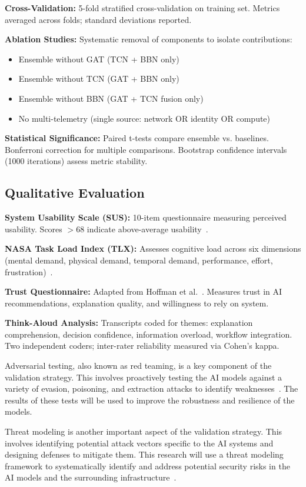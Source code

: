 \textbf{Cross-Validation:} 5-fold stratified cross-validation on training set. Metrics averaged across folds; standard deviations reported.

\textbf{Ablation Studies:} Systematic removal of components to isolate contributions:
\begin{itemize}
    \item Ensemble without GAT (TCN + BBN only)
    \item Ensemble without TCN (GAT + BBN only)
    \item Ensemble without BBN (GAT + TCN fusion only)
    \item No multi-telemetry (single source: network OR identity OR compute)
\end{itemize}

\textbf{Statistical Significance:} Paired t-tests compare ensemble vs. baselines. Bonferroni correction for multiple comparisons. Bootstrap confidence intervals (1000 iterations) assess metric stability.

\subsection{Qualitative Evaluation}
\textbf{System Usability Scale (SUS):} 10-item questionnaire measuring perceived usability. Scores $>$68 indicate above-average usability~\cite{brooke1996sus}.

\textbf{NASA Task Load Index (TLX):} Assesses cognitive load across six dimensions (mental demand, physical demand, temporal demand, performance, effort, frustration)~\cite{hart1988nasatlx}.

\textbf{Trust Questionnaire:} Adapted from Hoffman et al.~\cite{hoffman2018metrics}. Measures trust in AI recommendations, explanation quality, and willingness to rely on system.

\textbf{Think-Aloud Analysis:} Transcripts coded for themes: explanation comprehension, decision confidence, information overload, workflow integration. Two independent coders; inter-rater reliability measured via Cohen's kappa.

Adversarial testing, also known as red teaming, is a key component of the validation strategy. This involves proactively testing the AI models against a variety of evasion, poisoning, and extraction attacks to identify weaknesses~\cite{robustintelligence2024redteaming}. The results of these tests will be used to improve the robustness and resilience of the models.

Threat modeling is another important aspect of the validation strategy. This involves identifying potential attack vectors specific to the AI systems and designing defenses to mitigate them. This research will use a threat modeling framework to systematically identify and address potential security risks in the AI models and the surrounding infrastructure~\cite{mindgard2024threatmodeling}.

